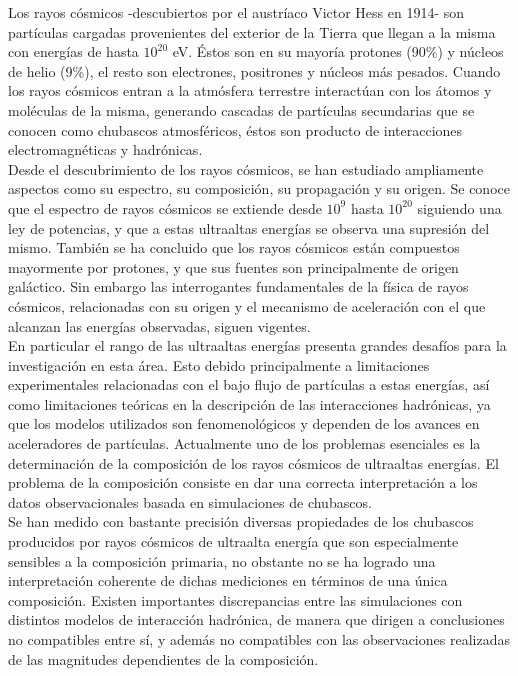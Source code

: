 Los rayos cósmicos -descubiertos por el austríaco Victor Hess en 1914- son partículas cargadas provenientes del exterior de la Tierra que llegan a la misma con energías de hasta $10^{20}$ eV. Éstos son en su mayoría protones (90\%) y núcleos de helio (9\%), el resto son electrones, positrones y núcleos más pesados. Cuando los rayos cósmicos entran a la atmósfera terrestre interactúan con los átomos y moléculas de la misma, generando cascadas de partículas secundarias que se conocen como chubascos atmosféricos, éstos son producto de interacciones electromagnéticas y hadrónicas. \\

Desde el descubrimiento de los rayos cósmicos, se han estudiado ampliamente aspectos como su espectro, su composición, su propagación y su origen. Se conoce que el espectro de rayos cósmicos se extiende desde $10^9$ hasta $10^{20}$ siguiendo una ley de potencias, y que a estas ultraaltas energías se observa una supresión del mismo. También se ha concluido que los rayos cósmicos están compuestos mayormente por protones, y que sus fuentes son principalmente de origen galáctico. Sin embargo las interrogantes fundamentales de la física de rayos cósmicos, relacionadas con su origen y el mecanismo de aceleración con el que alcanzan las energías observadas, siguen vigentes. \\

En particular el rango de las ultraaltas energías presenta grandes desafíos para la investigación en esta área. Esto debido principalmente a limitaciones experimentales relacionadas con el bajo flujo de partículas a estas energías, así como limitaciones teóricas en la descripción de las interacciones hadrónicas, ya que los modelos utilizados son fenomenológicos y dependen de los avances en aceleradores de partículas. Actualmente uno de los problemas esenciales es la determinación de la composición de los rayos cósmicos de ultraaltas energías. El problema de la composición consiste en dar una correcta interpretación a los datos observacionales basada en simulaciones de chubascos. \\

Se han medido con bastante precisión diversas propiedades de los chubascos producidos por rayos cósmicos de ultraalta energía que son especialmente sensibles a la composición primaria, no obstante no se ha logrado una interpretación coherente de dichas mediciones en términos de una única composición. Existen importantes discrepancias entre las simulaciones con distintos modelos de interacción hadrónica, de manera que dirigen a conclusiones no compatibles entre sí, y además no compatibles con las observaciones realizadas de las magnitudes dependientes de la composición.\\

